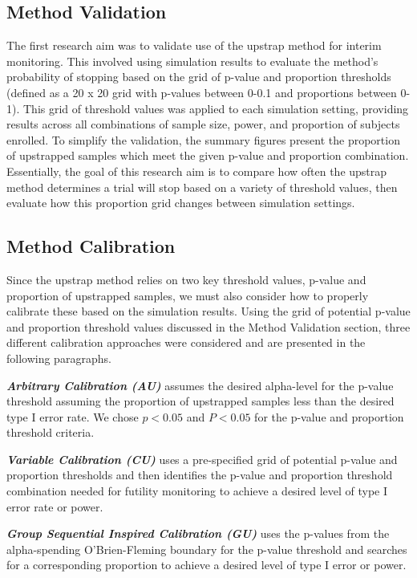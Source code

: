 \documentclass[Afour,sageh,times,square,numbers]{sagej}
\begin{document}
\subsection{Method Validation}

The first research aim was to validate use of the upstrap method for interim monitoring.  This involved using simulation results to evaluate the method’s probability of stopping based on the grid of p-value and proportion thresholds (defined as a 20 x 20 grid with p-values between 0-0.1 and proportions between 0-1).  This grid of threshold values was applied to each simulation setting, providing results across all combinations of sample size, power, and proportion of subjects enrolled.  To simplify the validation, the summary figures present the proportion of upstrapped samples which meet the given p-value and proportion combination.  Essentially, the goal of this research aim is to compare how often the upstrap method determines a trial will stop based on a variety of threshold values, then evaluate how this proportion grid changes between simulation settings. 

\subsection{Method Calibration}

Since the upstrap method relies on two key threshold values, p-value and proportion of upstrapped samples, we must also consider how to properly calibrate these based on the simulation results.  Using the grid of potential p-value and proportion threshold values discussed in the Method Validation section, three different calibration approaches were considered and are presented in the following paragraphs.

\textbf{\textit{Arbitrary Calibration (AU)}} assumes the desired alpha-level for the p-value threshold  assuming the proportion of upstrapped samples less than the desired type I error rate. We chose $p<0.05$ and $P<0.05$ for the p-value and proportion threshold criteria.

\textbf{\textit{Variable Calibration (CU)}} uses a pre-specified grid of potential p-value and proportion thresholds and then identifies the p-value and proportion threshold combination needed for futility monitoring to achieve a desired level of type I error rate or power.

\textbf{\textit{Group Sequential Inspired Calibration (GU)}} uses the p-values from the alpha-spending O’Brien-Fleming boundary for the p-value threshold and searches for a corresponding proportion to achieve a desired level of type I error or power.
\end{document}
